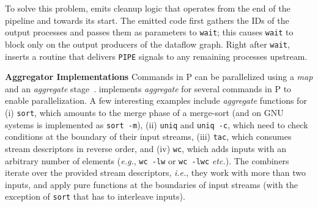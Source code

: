 \documentclass[letterpaper,twocolumn,10pt]{article}
\newcommand{\eg}{{\em e.g.}, }
\newcommand{\ie}{{\em i.e.}, }
\newcommand{\etc}{{\em etc.}\xspace}
\newcommand{\heading}[1]{\vspace{4pt}\noindent\textbf{#1}\enspace}
\newcommand{\ttt}[1]{\texttt{#1}}
\newcommand{\tcn}[1]{\mbox{\textcircled{\scriptsize #1}}}
\newcommand{\tpur}{\tcn{\textsc{P}}\xspace}
\newcommand{\todo}[1]{\hl{#1}\xspace}
\newcommand{\kk}[1]{[{\color{magenta}kk: #1}]}
\begin{document}
To solve this problem, \sys emits cleanup logic that operates from the
end of the pipeline and towards its start.  The emitted code first
gathers the IDs of the output processes and passes them as parameters
to \ttt{wait}; this causes \ttt{wait} to block only on the output
producers of the dataflow graph.  Right after \ttt{wait}, \sys inserts
a routine that delivers \ttt{PIPE} signals to any remaining processes
upstream.




\heading{Aggregator Implementations}
Commands in \tpur can be parallelized using a \emph{map} and an \emph{aggregate} stage~.
\sys implements \emph{aggregate} for several commands in \tpur to enable parallelization.
A few interesting examples include \emph{aggregate} functions for
  (i) \ttt{sort}, which amounts to the merge phase of a merge-sort (and on GNU systems is implemented as \ttt{sort -m}),
  (ii) \ttt{uniq} and \ttt{uniq -c}, which need to check conditions at the boundary of their input streams,
  (iii) \ttt{tac}, which consumes stream descriptors in reverse order, and 
  (iv) \ttt{wc}, which adds inputs with an arbitrary number of elements (\eg \ttt{wc -lw} or \ttt{wc -lwc} \etc).
The combiners iterate over the provided stream descriptors, \ie they work with more than two inputs, and apply pure functions at the boundaries of input streams (with the exception of \ttt{sort} that has to interleave inputs).
\end{document}
